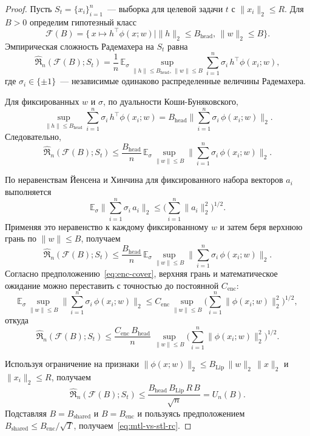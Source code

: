 \begin{proof}
Пусть $S_t = \{x_i\}_{i=1}^n$~--- выборка для целевой задачи $t$ с
$\|x_i\|_2 \le R$.
Для $B > 0$ определим гипотезный класс
\[
    \mathcal{F}(B)
    = \big\{\,x \mapsto h^\top \phi(x;w)
    \big|
    \|h\|_2 \le B_{\mathrm{head}},\, \|w\|_2 \le B
    \big\}.
\]
Эмпирическая сложность Радемахера на $S_t$ равна
\[
    \widehat{\mathfrak R}_n(\mathcal{F}(B);S_t)
    = \frac{1}{n}\,\mathbb{E}_{\sigma}
      \sup_{\|h\|\le B_{\mathrm{head}},\,\|w\|\le B}
      \sum_{i=1}^n \sigma_i\, h^\top \phi(x_i;w),
\]
где $\sigma_i \in \{\pm1\}$~--- независимые одинаково распределенные величины Радемахера.

Для фиксированных $w$ и $\sigma$, по дуальности Коши-Буняковского,
\[
    \sup_{\|h\|\le B_{\mathrm{head}}}
    \sum_{i=1}^n \sigma_i\, h^\top \phi(x_i;w)
    = B_{\mathrm{head}}
      \Big\|\sum_{i=1}^n \sigma_i\, \phi(x_i;w)\Big\|_2.
\]
Следовательно,
\[
    \widehat{\mathfrak R}_n(\mathcal{F}(B);S_t)
    \le
    \frac{B_{\mathrm{head}}}{n}\,
    \mathbb{E}_{\sigma}
    \sup_{\|w\|\le B}
      \Big\|\sum_{i=1}^n \sigma_i\, \phi(x_i;w)\Big\|_2.
\]

По неравенствам Йенсена и Хинчина для фиксированного набора векторов
$a_i$ выполняется
\[
    \mathbb{E}_{\sigma}
      \Big\|\sum_{i=1}^n \sigma_i\,a_i\Big\|_2
    \le
    \Big(\sum_{i=1}^n \|a_i\|_2^2\Big)^{1/2}.
\]
Применяя это неравенство к каждому фиксированному $w$ и затем беря верхнюю
грань по $\|w\|\le B$, получаем
\[
    \widehat{\mathfrak R}_n(\mathcal{F}(B);S_t)
    \le
    \frac{B_{\mathrm{head}}}{n}\,
    \mathbb{E}_{\sigma}
    \sup_{\|w\|\le B}
      \Big\|\sum_{i=1}^n \sigma_i\,\phi(x_i;w)\Big\|_2.
\]
Согласно предположению~\eqref{eq:enc-cover}, верхняя грань и математическое
ожидание можно переставить с точностью до постоянной $C_{\mathrm{enc}}$:
\[
    \mathbb{E}_{\sigma}
    \sup_{\|w\|\le B}
      \Big\|\sum_{i=1}^n \sigma_i\,\phi(x_i;w)\Big\|_2
    \le
    C_{\mathrm{enc}}
    \sup_{\|w\|\le B}
      \Big(\sum_{i=1}^n \|\phi(x_i;w)\|_2^2\Big)^{1/2},
\]
откуда
\[
    \widehat{\mathfrak R}_n(\mathcal{F}(B);S_t)
    \le
    \frac{C_{\mathrm{enc}}\,B_{\mathrm{head}}}{n}\,
    \sup_{\|w\|\le B}
      \Big(\sum_{i=1}^n \|\phi(x_i;w)\|_2^2\Big)^{1/2}.
\]

Используя ограничение на признаки $\|\phi(x;w)\|_2 \le B_{\mathrm{Lip}}\,\|w\|_2\,\|x\|_2$ и $\|x_i\|_2 \le R$, получаем
\[
    \widehat{\mathfrak R}_n(\mathcal{F}(B);S_t)
    \le
    \frac{B_{\mathrm{head}}\,B_{\mathrm{Lip}}\,R\,B}{\sqrt{n}}
    = U_n(B).
\]
Подставляя $B=B_{\mathrm{shared}}$ и $B=B_{\mathrm{enc}}$ и пользуясь предположением $B_{\mathrm{shared}}\le B_{\mathrm{enc}}/\sqrt{T}$, получаем~\eqref{eq:mtl-vs-stl-rc}.
\end{proof}

